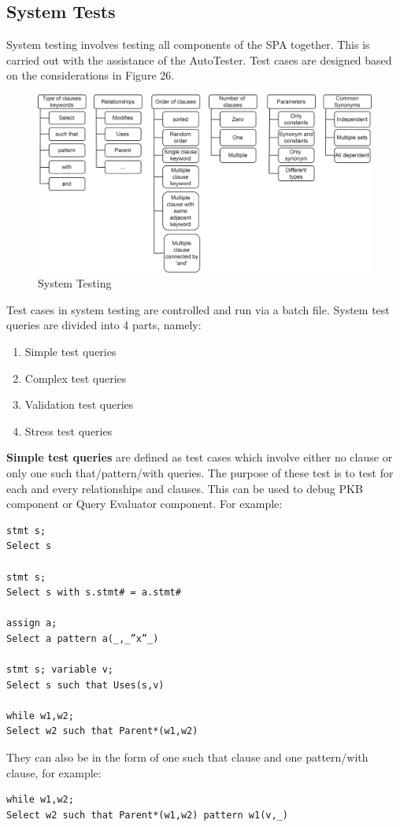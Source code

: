 \documentclass[12pt]{article}
\begin{document}
{{{{{{{{{{{{{\subsection{System Tests}
System testing involves testing all components of the SPA together. This is carried out with the assistance of the AutoTester. Test cases are designed based on the considerations in Figure 26.
\begin{figure}[h]
\includegraphics[width = 1.0\textwidth]{systemTesting.png}
\caption{System Testing}
\end{figure}
Test cases in system testing are controlled and run via a batch file.
System test queries are divided into 4 parts, namely:
\begin{enumerate}
\item Simple test queries
\item Complex test queries
\item Validation test queries
\item Stress test queries
\end{enumerate}

\textbf{Simple test queries} are defined as test cases which involve either no clause or only one such that/pattern/with queries. The purpose of these test is to test for each and every relationships and clauses. This can be used to debug PKB component or Query Evaluator component. For example:

\begin{verbatim}
stmt s;
Select s

stmt s;
Select s with s.stmt# = a.stmt#

assign a;
Select a pattern a(_,_”x”_)

stmt s; variable v;
Select s such that Uses(s,v)

while w1,w2;
Select w2 such that Parent*(w1,w2)
\end{verbatim}
They can also be in the form of one such that clause and one pattern/with clause, for example:
\begin{verbatim}
while w1,w2;
Select w2 such that Parent*(w1,w2) pattern w1(v,_)


\end{verbatim}}}}}}}}}}}}}}
\end{document}
